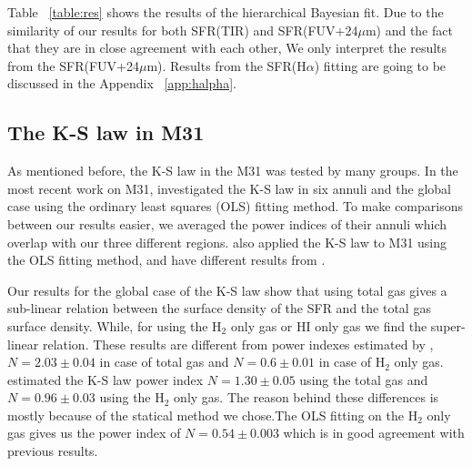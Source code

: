 \documentclass[useAMS,usenatbib]{mn2e}
\begin{document}


Table ~\ref{table:res} shows the results of the hierarchical Bayesian fit. Due to the similarity of our results for both SFR(TIR) and SFR(FUV+24$\mu$m) and the fact that they are in close agreement with each other, 
We only interpret the results from the SFR(FUV+24$\mu$m). Results from the SFR(H$\alpha$) fitting are going to be discussed in the Appendix ~\ref{app:halpha}. %

\subsection{The K-S law in M31}

As mentioned before, the K-S law in the M31 was tested by many groups. %
In the most recent work on M31, \cite{Ford13} investigated the K-S law in six annuli and the global case using the ordinary least squares (OLS) fitting method. To make comparisons between our results easier, we averaged the power indices of their annuli which overlap with our three different regions. \cite{Tabatabaei10} also applied the K-S law to M31 using the OLS fitting method, and have different results from \cite{Ford13}.

Our results for the global case of the K-S law show that using total gas gives a sub-linear relation between the surface density of the SFR and the total gas surface density. While, for using the H$_{2}$ only gas or HI only gas we find the super-linear relation. These results are different from power indexes estimated by \cite{Ford13}, $N=2.03\pm0.04$ in case of total gas and $N=0.6\pm0.01$ in case of H$_{2}$ only gas. \cite{Tabatabaei10} estimated the K-S law power index $N=1.30\pm0.05$ using the total gas and $N=0.96\pm0.03$ using the H$_{2}$ only gas. The reason behind these differences is mostly because of the statical method we chose.The OLS fitting on the H$_{2}$ only gas gives us the power index of $N=0.54\pm0.003$ which is in good agreement with previous results.
\end{document}
